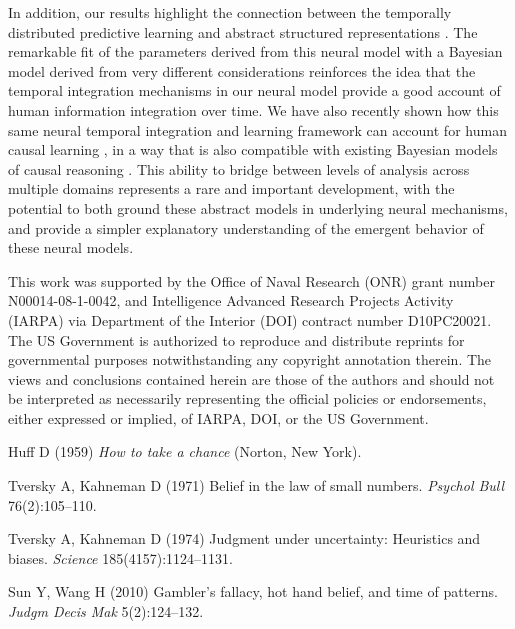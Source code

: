 \documentclass{pnastwo}
\begin{document}
\begin{article}
In addition, our results highlight the connection between the temporally distributed predictive learning \cite{OReilly2012wiki,OReilly2014TI,Gerstner2012} and abstract structured representations \cite{Griffiths2001,Tenenbaum2011}.
The remarkable fit of the parameters derived from this neural model with a Bayesian model derived from very different considerations reinforces the idea that the temporal integration mechanisms in our neural model provide a good account of human information integration over time.
We have also recently shown how this same neural temporal integration and learning framework can account for human causal learning \cite{OReilly2014blicket}, in a way that is also compatible with existing Bayesian models of causal reasoning \cite{Griffiths2010TiCS}.
This ability to bridge between levels of analysis across multiple domains represents a rare and important development, with the potential to both ground these abstract models in underlying neural mechanisms, and provide a simpler explanatory understanding of the emergent behavior of these neural models.


\begin{acknowledgments}
This work was supported by the Office of Naval Research (ONR) grant number N00014-08-1-0042, and Intelligence Advanced Research Projects Activity (IARPA) via Department of the Interior (DOI) contract number D10PC20021. The US Government is authorized to reproduce and distribute reprints for governmental purposes notwithstanding any copyright annotation therein. The views and conclusions contained herein are those of the authors and should not be interpreted as necessarily representing the official policies or endorsements, either expressed or implied, of IARPA, DOI, or the US Government.
\end{acknowledgments}

\begin{thebibliography}{10}
Huff D (1959) {\em How to take a chance} (Norton, New York).

Tversky A, Kahneman D (1971) Belief in the law of small numbers. {\em Psychol Bull} 76(2):105--110.

Tversky A, Kahneman D (1974) Judgment under uncertainty: Heuristics and biases. {\em Science} 185(4157):1124--1131.

Sun Y, Wang H (2010) Gambler's fallacy, hot hand belief, and time of patterns. {\em Judgm Decis Mak} 5(2):124--132.


\end{thebibliography}
\end{article}
\end{document}
